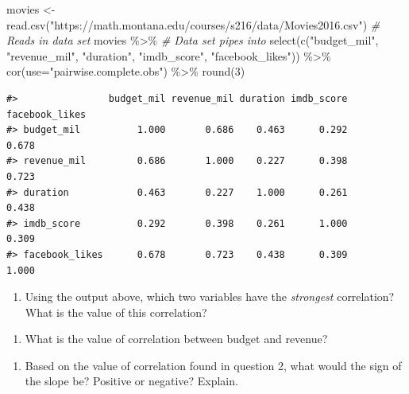 \documentclass[
]{report}
\newenvironment{Shaded}{\begin{snugshade}}{\end{snugshade}}
\newcommand{\AttributeTok}[1]{\textcolor[rgb]{0.77,0.63,0.00}{#1}}
\newcommand{\CommentTok}[1]{\textcolor[rgb]{0.56,0.35,0.01}{\textit{#1}}}
\newcommand{\DecValTok}[1]{\textcolor[rgb]{0.00,0.00,0.81}{#1}}
\newcommand{\FunctionTok}[1]{\textcolor[rgb]{0.00,0.00,0.00}{#1}}
\newcommand{\NormalTok}[1]{#1}
\newcommand{\OtherTok}[1]{\textcolor[rgb]{0.56,0.35,0.01}{#1}}
\newcommand{\SpecialCharTok}[1]{\textcolor[rgb]{0.00,0.00,0.00}{#1}}
\newcommand{\StringTok}[1]{\textcolor[rgb]{0.31,0.60,0.02}{#1}}
\providecommand{\tightlist}{%
  \setlength{\itemsep}{0pt}\setlength{\parskip}{0pt}}
\begin{document}
\begin{Shaded}
\begin{Highlighting}[]
\NormalTok{movies }\OtherTok{\textless{}{-}} \FunctionTok{read.csv}\NormalTok{(}\StringTok{"https://math.montana.edu/courses/s216/data/Movies2016.csv"}\NormalTok{) }\CommentTok{\# Reads in data set}
\NormalTok{movies }\SpecialCharTok{\%\textgreater{}\%}  \CommentTok{\# Data set pipes into}
  \FunctionTok{select}\NormalTok{(}\FunctionTok{c}\NormalTok{(}\StringTok{"budget\_mil"}\NormalTok{, }\StringTok{"revenue\_mil"}\NormalTok{, }
           \StringTok{"duration"}\NormalTok{, }\StringTok{"imdb\_score"}\NormalTok{, }
           \StringTok{"facebook\_likes"}\NormalTok{)) }\SpecialCharTok{\%\textgreater{}\%}
  \FunctionTok{cor}\NormalTok{(}\AttributeTok{use=}\StringTok{"pairwise.complete.obs"}\NormalTok{) }\SpecialCharTok{\%\textgreater{}\%}
  \FunctionTok{round}\NormalTok{(}\DecValTok{3}\NormalTok{)}
\end{Highlighting}
\end{Shaded}

\begin{verbatim}
#>                budget_mil revenue_mil duration imdb_score facebook_likes
#> budget_mil          1.000       0.686    0.463      0.292          0.678
#> revenue_mil         0.686       1.000    0.227      0.398          0.723
#> duration            0.463       0.227    1.000      0.261          0.438
#> imdb_score          0.292       0.398    0.261      1.000          0.309
#> facebook_likes      0.678       0.723    0.438      0.309          1.000
\end{verbatim}

\begin{enumerate}
\def\labelenumi{\arabic{enumi}.}
\tightlist
\item
  Using the output above, which two variables have the \emph{strongest} correlation? What is the value of this correlation?
\end{enumerate}

\vspace{0.5in}

\begin{enumerate}
\def\labelenumi{\arabic{enumi}.}
\setcounter{enumi}{1}
\tightlist
\item
  What is the value of correlation between budget and revenue?
\end{enumerate}

\vspace{0.3in}

\begin{enumerate}
\def\labelenumi{\arabic{enumi}.}
\setcounter{enumi}{2}
\tightlist
\item
  Based on the value of correlation found in question 2, what would the sign of the slope be? Positive or negative? Explain.
\end{enumerate}
\end{document}
